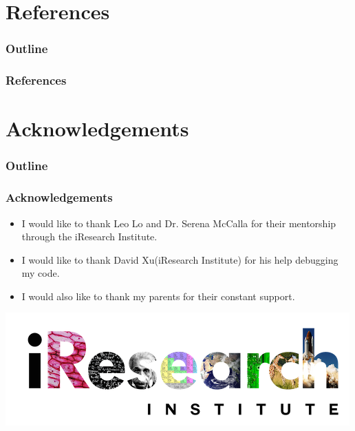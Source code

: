 \documentclass[12pt]{beamer}
\begin{document}
\section{References}
\begin{frame}
\frametitle{Outline}
\tableofcontents[currentsection]
\end{frame}

\begin{frame}
\frametitle{References}
\end{frame}


\section{Acknowledgements}
\begin{frame}
\frametitle{Outline}
\tableofcontents[currentsection]
\end{frame}

\begin{frame}
\frametitle{Acknowledgements}
\begin{itemize}
    \item I would like to thank Leo Lo and Dr. Serena McCalla for their mentorship through the iResearch Institute.
    \item I would like to thank David Xu(iResearch Institute) for his help debugging my code.
    \item I would also like to thank my parents for their constant support.
\end{itemize}



\begin{center}
\includegraphics[scale = 0.58]{iresearch.png}
\end{center}


\end{frame}
\end{document}
